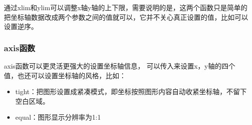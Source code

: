 \documentclass[letterpaper,10pt,english]{sphinxhowto}
\begin{document}
通过xlim和ylim可以调整x轴y轴的上下限，需要说明的是，这两个函数只是简单的把坐标轴数据改成两个参数之间的值就可以，它并不关心真正设置的值，比如可以设置逆序。

%
\begin{sphinxVerbatim}[commandchars=\\\{\}]
 

\end{sphinxVerbatim}

%
\begin{sphinxVerbatim}[commandchars=\\\{\}]
 
\end{sphinxVerbatim}



\subsubsection{axis函数}
\label{\detokenize{_u56fe_u5f62_u7b80_u5355_u7ed8_u5236:axis}}
axis函数可以更灵活更强大的设置坐标轴信息， 可以传入来设置x，y轴的四个值，也还可以设置坐标轴的风格，比如：
\begin{itemize}
\item {} 
tight：把图形设置成紧凑模式，即坐标按照图形内容自动收紧坐标轴，不留下空白区域。

\item {} 
equal：图形显示分辨率为1:1

\end{itemize}

%
\begin{sphinxVerbatim}[commandchars=\\\{\}]

 
\PYG{p}{[}\PYG{p}{]}
\end{sphinxVerbatim}
\end{document}
